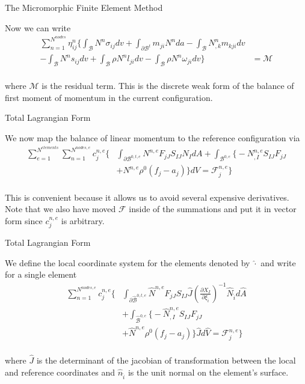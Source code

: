 \documentclass[11pt]{beamer}
\begin{document}
\begin{frame}{The Micromorphic Finite Element Method}

Now we can write
\begin{align*}
\sum_{n=1}^{N^{nodes}} \eta_{ij}^n \bigg\{\int_{\mathcal{B}} N^n \sigma_{ij} dv + \int_{\partial \mathcal{B}^t} m_{ji} N^n da - \int_{\mathcal{B}} N_{,k}^n m_{kji}dv&\\ - \int_{\mathcal{B}} N^n s_{ij}dv + \int_{\mathcal{B}} \rho N^n l_{ji}dv - \int_{\mathcal{B}} \rho N^n \omega_{ji} dv\bigg\}&= \mathcal{M}\\
\end{align*}

where $\mathcal{M}$ is the residual term. This is the discrete weak form of the balance of first moment of momentum in the current configuration.

\end{frame}

\begin{frame}{Total Lagrangian Form}

We now map the balance of linear momentum to the reference configuration via
\begin{align*}
\sum_{e=1}^{N^{elements}} \sum_{n=1}^{N^{nodes,e}} c^{n,e}_j \bigg\{&\int_{\partial \mathcal{B}^{0,t,e}} N^{n,e} F_{jJ} S_{IJ} N_{I} dA + \int_{\mathcal{B}^{0,e}} \big\{- N^{n,e}_{,I} S_{IJ} F_{jJ}\\
& + N^{n,e} \rho^0 \left(f_j - a_j\right) \big\} dV = \mathcal{F}_j^{n,e}\bigg\}\\
\end{align*}

This is convenient because it allows us to avoid several expensive derivatives. Note that we also have moved $\mathcal{F}$ inside of the summations and put it in vector form since $c_j^{n,e}$ is arbitrary.

\end{frame}

\begin{frame}{Total Lagrangian Form}

We define the local coordinate system for the elements denoted by $\hat{\cdot}$ and write for a single element
\begin{align*}
\sum_{n=1}^{N^{nodes,e}} c^{n,e}_j \bigg\{&\int_{\partial \hat{\mathcal{B}}^{0,t,e}} \hat{N}^{n,e} F_{jJ} S_{IJ} \hat{J} \left(\frac{\partial X_{I}}{\partial \xi_{\hat{i}}}\right)^{-1} \hat{N}_{\hat{i}} d\hat{A}\\
& + \int_{\hat{\mathcal{B}}^{0,e}} \big\{- \hat{N}^{n,e}_{,I} S_{IJ} F_{jJ}\\
& + \hat{N}^{n,e} \rho^0 \left(f_j - a_j\right) \big\} \hat{J} d\hat{V} = \mathcal{F}_j^{n,e}\bigg\}\\
\end{align*}

where $\hat{J}$ is the determinant of the jacobian of transformation between the local and reference coordinates and $\hat{n}_{\hat{i}}$ is the unit normal on the element's surface.

\end{frame}
\end{document}
